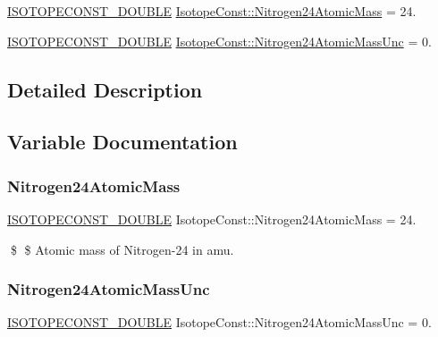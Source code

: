 \begin{DoxyCompactItemize}
\item 
\mbox{\hyperlink{group___isotope_const-_macros_ga8f45a7272ce02c0b4c65c44636ed719a}{I\+S\+O\+T\+O\+P\+E\+C\+O\+N\+S\+T\+\_\+\+D\+O\+U\+B\+LE}} \mbox{\hyperlink{group___isotope_const-_nitrogen-_n24_ga803085c7ad8ae73a13a359b6a7cdb455}{Isotope\+Const\+::\+Nitrogen24\+Atomic\+Mass}} = 24.
\item 
\mbox{\hyperlink{group___isotope_const-_macros_ga8f45a7272ce02c0b4c65c44636ed719a}{I\+S\+O\+T\+O\+P\+E\+C\+O\+N\+S\+T\+\_\+\+D\+O\+U\+B\+LE}} \mbox{\hyperlink{group___isotope_const-_nitrogen-_n24_gac03c5a2d2dceac3552dbe6c0f93836ed}{Isotope\+Const\+::\+Nitrogen24\+Atomic\+Mass\+Unc}} = 0.
\end{DoxyCompactItemize}


\subsection{Detailed Description}


\subsection{Variable Documentation}
\mbox{\label{group___isotope_const-_nitrogen-_n24_ga803085c7ad8ae73a13a359b6a7cdb455}} 
\subsubsection{\texorpdfstring{Nitrogen24\+Atomic\+Mass}{Nitrogen24AtomicMass}}
{\footnotesize\ttfamily \mbox{\hyperlink{group___isotope_const-_macros_ga8f45a7272ce02c0b4c65c44636ed719a}{I\+S\+O\+T\+O\+P\+E\+C\+O\+N\+S\+T\+\_\+\+D\+O\+U\+B\+LE}} Isotope\+Const\+::\+Nitrogen24\+Atomic\+Mass = 24.}

\$ \$ Atomic mass of Nitrogen-\/24 in amu. \mbox{\label{group___isotope_const-_nitrogen-_n24_gac03c5a2d2dceac3552dbe6c0f93836ed}} 
\subsubsection{\texorpdfstring{Nitrogen24\+Atomic\+Mass\+Unc}{Nitrogen24AtomicMassUnc}}
{\footnotesize\ttfamily \mbox{\hyperlink{group___isotope_const-_macros_ga8f45a7272ce02c0b4c65c44636ed719a}{I\+S\+O\+T\+O\+P\+E\+C\+O\+N\+S\+T\+\_\+\+D\+O\+U\+B\+LE}} Isotope\+Const\+::\+Nitrogen24\+Atomic\+Mass\+Unc = 0.}

